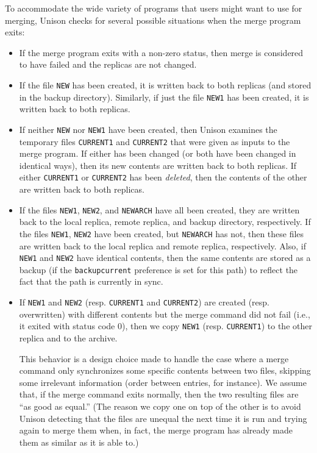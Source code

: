 \documentclass{article}
\begin{document}
To accommodate the wide variety of programs that users might want to use for
merging, Unison checks for several possible situations when the merge
program exits:
\begin{itemize}
\item If the merge program exits with a non-zero status, then merge is
  considered to have failed and the replicas are not changed.
\item If the file \verb|NEW| has been created, it is written back to both
  replicas (and stored in the backup directory).  Similarly, if just the
  file \verb|NEW1| has been created, it is written back to both
  replicas.
\item If neither \verb|NEW| nor \verb|NEW1| have been created, then Unison
  examines the temporary files \verb|CURRENT1|  and \verb|CURRENT2| that
  were given as inputs to the merge program.  If either has been changed (or
  both have been changed in identical ways), then its new contents are written
  back to both replicas.  If either \verb|CURRENT1| or \verb|CURRENT2| has
  been {\em deleted}, then the contents of the other are written back to
  both replicas.
\item If the files \verb|NEW1|, \verb|NEW2|, and \verb|NEWARCH| have all
  been created, they are written back to the local replica, remote replica,
  and backup directory, respectively. If the files \verb|NEW1|, \verb|NEW2| have
  been created, but \verb|NEWARCH| has not, then these files are written back to the
  local replica and remote replica, respectively.  Also, if \verb|NEW1| and
  \verb|NEW2| have identical contents, then the same contents are stored as
  a backup (if the \verb|backupcurrent| preference is set for this path) to
  reflect the fact that the path is currently in sync.
  \item If \verb|NEW1| and \verb|NEW2| (resp. \verb|CURRENT1| and
  \verb|CURRENT2|) are created (resp. overwritten) with different contents
  but the merge command did not fail (i.e., it exited with status code 0),
  then we copy \verb|NEW1| (resp. \verb|CURRENT1|) to the other replica and
  to the archive.

  This behavior is a design choice made to handle the case where a merge
  command only synchronizes some specific contents between two files,
  skipping some irrelevant information (order between entries, for
  instance).  We assume that, if the merge command exits normally, then the
  two resulting files are ``as good as equal.'' (The reason we copy one on
  top of the other is to avoid Unison detecting that the files are unequal
  the next time it is run and trying again to merge them when, in fact, the
  merge program has already made them as similar as it is able to.)
\end{itemize}
\end{document}
